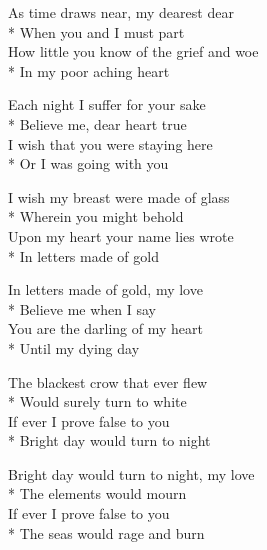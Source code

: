 

\versemark
As time draws near, my dearest dear\\*
When you and I must part\\
How little you know of the grief and woe\\*
In my poor aching heart

\contd
{}

Each night I suffer for your sake\\*
Believe me, dear heart true\\
I wish that you were staying here\\*
Or I was going with you

\versemark
I wish my breast were made of glass\\*
Wherein you might behold\\
Upon my heart your name lies wrote\\*
In letters made of gold

In letters made of gold, my love\\*
Believe me when I say\\
You are the darling of my heart\\*
Until my dying day

\versemark
The blackest crow that ever flew\\*
Would surely turn to white\\
If ever I prove false to you\\*
Bright day would turn to night

Bright day would turn to night, my love\\*
The elements would mourn\\
If ever I prove false to you\\*
The seas would rage and burn

